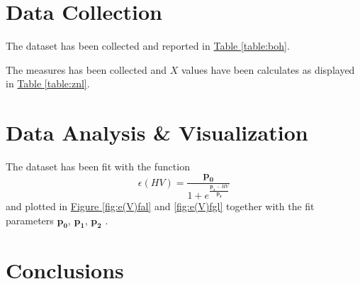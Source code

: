 \documentclass[a4paper,12pt,abstracton]{scrartcl}
\begin{document}
\section{Data Collection}
The dataset has been collected and reported in \hyperref[table:boh]{Table \ref*{table:boh}}. \newline 

The measures has been collected and $X$ values have been calculates as displayed in \hyperref[table:znl]{Table \ref*{table:znl}}.

\section{Data Analysis \& Visualization}
The dataset has been fit with the function $$\epsilon(HV)=\frac{\boldsymbol{p_0}}{1+e^{\frac{\boldsymbol{p_1}-HV}{\boldsymbol{p_2}}}}$$
and plotted in \hyperref[fig:e(V)fal]{Figure \ref*{fig:e(V)fal}} and \hyperref[fig:e(V)fgl]{ \ref*{fig:e(V)fgl}}  together with the fit parameters $\boldsymbol{p_0}$, $\boldsymbol{p_1}$, $\boldsymbol{p_2}$ .

\section{Conclusions}


%
%
\end{document}
